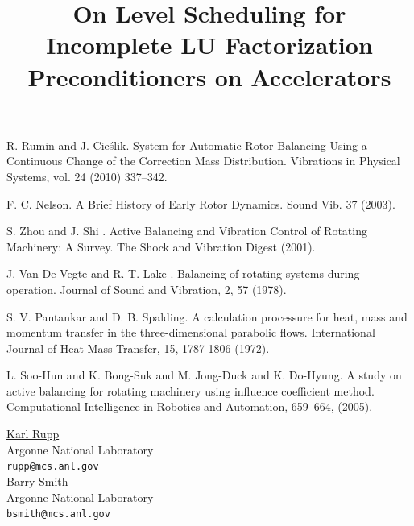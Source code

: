 \documentclass[article,A4,11pt]{llncs}%
\begin{document}

\begin{thebibliography}{10}
{\sc R. Rumin and J. Cieślik}. {System for Automatic Rotor Balancing Using a Continuous Change of the Correction Mass Distribution}. Vibrations in Physical Systems, vol. 24 (2010) 337–342.

{\sc F. C. Nelson}. {A Brief History of Early Rotor Dynamics}. Sound Vib. 37 (2003).

{\sc S. Zhou and J. Shi }. {Active Balancing and Vibration Control of Rotating Machinery: A Survey}. The Shock and Vibration Digest (2001).

{\sc  J. Van De Vegte and R. T. Lake }. {Balancing of rotating systems during operation}. Journal of Sound and Vibration, 2, 57 (1978).

{\sc S. V. Pantankar and D. B. Spalding}. {A calculation processure for heat, mass and momentum transfer in the three-dimensional parabolic flows}. International Journal of Heat Mass Transfer, 15, 1787-1806 (1972).

{\sc L. Soo-Hun and K. Bong-Suk and M. Jong-Duck and K. Do-Hyung}. {A study on active balancing for rotating machinery using influence coefficient method}. Computational Intelligence in Robotics and Automation, 659–664, (2005).
\end{thebibliography}

\title{On Level Scheduling for Incomplete LU Factorization Preconditioners on Accelerators}
 \author{} \institute{}
\maketitle
\begin{center}
{\large \underline{Karl Rupp}}\\
Argonne National Laboratory\\
{\tt rupp@mcs.anl.gov}
\\ \vspace{4mm}
{\large Barry Smith}\\
Argonne National Laboratory\\
{\tt bsmith@mcs.anl.gov}
\end{center}
\end{document}
